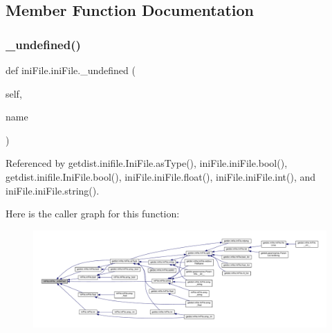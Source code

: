 \subsection{Member Function Documentation}
\mbox{\label{classiniFile_1_1iniFile_a86334cbd335c1de34ddeef62bc7d934e}} 
\subsubsection{\texorpdfstring{\+\_\+undefined()}{\_undefined()}}
{\footnotesize\ttfamily def ini\+File.\+ini\+File.\+\_\+undefined (\begin{DoxyParamCaption}\item[{}]{self,  }\item[{}]{name }\end{DoxyParamCaption})\hspace{0.3cm}{\ttfamily [private]}}



Referenced by getdist.\+inifile.\+Ini\+File.\+as\+Type(), ini\+File.\+ini\+File.\+bool(), getdist.\+inifile.\+Ini\+File.\+bool(), ini\+File.\+ini\+File.\+float(), ini\+File.\+ini\+File.\+int(), and ini\+File.\+ini\+File.\+string().

Here is the caller graph for this function\+:
\nopagebreak
\begin{figure}[H]
\begin{center}
\leavevmode
\includegraphics[width=350pt]{classiniFile_1_1iniFile_a86334cbd335c1de34ddeef62bc7d934e_icgraph}
\end{center}
\end{figure}
\mbox{\label{classiniFile_1_1iniFile_abf1b3994c4b30f12a06b51562e30898f}} 
